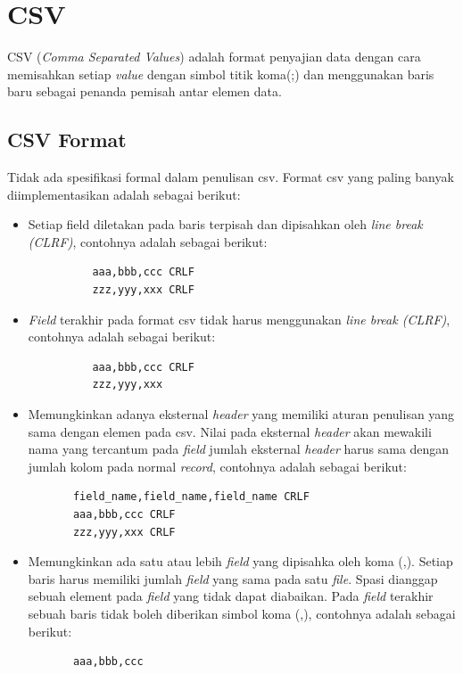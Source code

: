 \section{CSV}
\label{subsec:csv}
CSV (\textit{Comma Separated Values}) adalah format penyajian data  dengan cara memisahkan setiap \textit{value} dengan simbol titik koma(;) dan menggunakan baris baru sebagai penanda pemisah antar elemen data\cite{RFC:4180}.

\subsection{CSV Format}
Tidak ada spesifikasi formal dalam penulisan csv. Format csv yang paling banyak diimplementasikan adalah sebagai berikut:

\begin{itemize}
    \item Setiap field diletakan pada baris terpisah dan dipisahkan oleh \textit{line break (CLRF)}, contohnya adalah sebagai berikut:
    \begin{lstlisting}
          aaa,bbb,ccc CRLF
          zzz,yyy,xxx CRLF
    \end{lstlisting}
    \item \textit{Field} terakhir pada format csv tidak harus menggunakan \textit{line break (CLRF)}, contohnya adalah sebagai berikut:
        \begin{lstlisting}
          aaa,bbb,ccc CRLF
          zzz,yyy,xxx 
    \end{lstlisting}
    \item Memungkinkan adanya eksternal \textit{header} yang memiliki aturan penulisan yang sama dengan elemen pada csv. Nilai pada eksternal \textit{header} akan mewakili nama yang tercantum pada \textit{field} jumlah eksternal \textit{header} harus sama dengan jumlah kolom pada normal \textit{record}, contohnya adalah sebagai berikut:
    \begin{lstlisting}
       field_name,field_name,field_name CRLF
       aaa,bbb,ccc CRLF
       zzz,yyy,xxx CRLF
    \end{lstlisting}
    
    \item Memungkinkan ada satu atau lebih \textit{field} yang dipisahka oleh koma (,). Setiap baris harus memiliki jumlah \textit{field} yang sama pada satu \textit{file}. Spasi dianggap sebuah element pada \textit{field} yang tidak dapat diabaikan. Pada \textit{field} terakhir sebuah baris tidak boleh diberikan simbol koma (,), contohnya adalah sebagai berikut:
    \begin{lstlisting}
       aaa,bbb,ccc
    \end{lstlisting}
    

\end{itemize}
